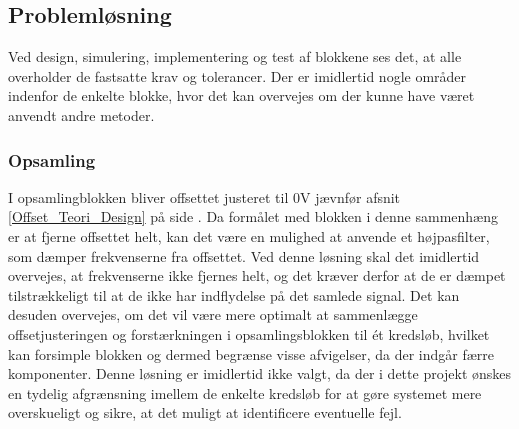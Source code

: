 \subsection{Problemløsning}
Ved design, simulering, implementering og test af blokkene ses det, at alle overholder de fastsatte krav og tolerancer. Der er imidlertid nogle områder indenfor de enkelte blokke, hvor det kan overvejes om der kunne have været anvendt andre metoder.

\subsubsection{Opsamling}
I opsamlingblokken bliver offsettet justeret til $0$V jævnfør afsnit \ref{Offset_Teori_Design} på side \pageref{Offset_Teori_Design}. Da formålet med blokken i denne sammenhæng er at fjerne offsettet helt, kan det være en mulighed at anvende et højpasfilter, som dæmper frekvenserne fra offsettet. Ved denne løsning skal det imidlertid overvejes, at frekvenserne ikke fjernes helt, og det kræver derfor at de er dæmpet tilstrækkeligt til at de ikke har indflydelse på det samlede signal. Det kan desuden overvejes, om det vil være mere optimalt at sammenlægge offsetjusteringen og forstærkningen i opsamlingsblokken til ét kredsløb, hvilket kan forsimple blokken og dermed begrænse visse afvigelser, da der indgår færre komponenter. Denne løsning er imidlertid ikke valgt, da der i dette projekt ønskes en tydelig afgrænsning imellem de enkelte kredsløb for at gøre systemet mere overskueligt og sikre, at det muligt at identificere eventuelle fejl. 

